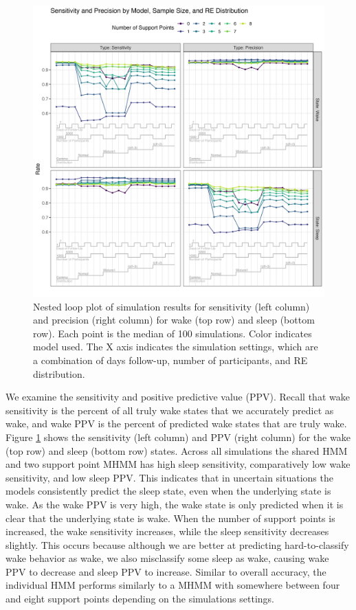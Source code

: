 \documentclass[num-refs]{wiley-article}
\begin{document}
\begin{figure}
\includegraphics[scale=.65]{Support/NestedLoopSP.png}
\centering
\caption{Nested loop plot of simulation results for sensitivity (left column) and precision (right column) for wake (top row) and sleep (bottom row). Each point is the median of 100 simulations. Color indicates model used. The X axis indicates the simulation settings, which are a combination of days follow-up, number of participants, and RE distribution.}
\label{NL2}
\end{figure}

We examine the sensitivity and positive predictive value (PPV). Recall that wake sensitivity is the percent of all truly wake states that we accurately predict as wake, and wake PPV is the percent of predicted wake states that are truly wake. Figure \ref{NL2} shows the sensitivity (left column) and PPV (right column) for the wake (top row) and sleep (bottom row) states. Across all simulations the shared HMM and two support point MHMM has high sleep sensitivity, comparatively low wake sensitivity, and low sleep PPV. This indicates that in uncertain situations the models consistently predict the sleep state, even when the underlying state is wake. As the wake PPV is very high, the wake state is only predicted when it is clear that the underlying state is wake. When the number of support points is increased, the wake sensitivity increases, while the sleep sensitivity decreases slightly. This occurs because although we are better at predicting hard-to-classify wake behavior as wake, we also misclassify some sleep as wake, causing wake PPV to decrease and sleep PPV to increase. Similar to overall accuracy, the individual HMM performs similarly to a MHMM with somewhere between four and eight support points depending on the simulations settings.
\end{document}
